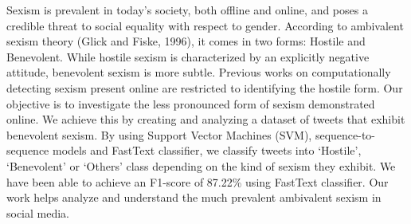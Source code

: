 Sexism is prevalent in today's society, both offline and online, and poses a credible threat to social equality with respect to gender. According to ambivalent sexism theory (Glick and Fiske, 1996), it comes in two forms: Hostile and Benevolent. While hostile sexism is characterized by an explicitly negative attitude, benevolent sexism is more subtle. Previous works on computationally detecting sexism present online are restricted to identifying the hostile form. Our objective is to investigate the less pronounced form of sexism demonstrated online. We achieve this by creating and analyzing a dataset of tweets that exhibit benevolent sexism. By using Support Vector Machines (SVM), sequence-to-sequence models and FastText classifier, we classify tweets into ‘Hostile', ‘Benevolent' or ‘Others' class depending on the kind of sexism they exhibit. We have been able to achieve an F1-score of 87.22\% using FastText classifier. Our work helps analyze and understand the much prevalent ambivalent sexism in social media.
